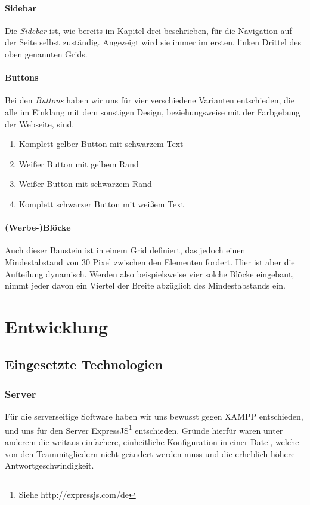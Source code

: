 \documentclass[12pt,a4paper]{article}
\begin{document}
\paragraph{Sidebar}
Die \textit{Sidebar} ist, wie bereits im Kapitel drei beschrieben, für die Navigation auf der Seite selbst zuständig. Angezeigt wird sie immer im ersten, linken Drittel des oben genannten Grids.
\paragraph{Buttons}
Bei den \textit{Buttons} haben wir uns für vier verschiedene Varianten entschieden, die alle im Einklang mit dem sonstigen Design, beziehungsweise mit der Farbgebung der Webseite, sind.
\begin{enumerate}
\item{Komplett gelber Button mit schwarzem Text}
\item{Weißer Button mit gelbem Rand}
\item{Weißer Button mit schwarzem Rand}
\item{Komplett schwarzer Button mit weißem Text}
\end{enumerate}
\paragraph{(Werbe-)Blöcke}
Auch dieser Baustein ist in einem Grid definiert, das jedoch einen Mindestabstand von 30 Pixel zwischen den Elementen fordert. Hier ist aber die Aufteilung dynamisch. Werden also beispielsweise vier solche Blöcke eingebaut, nimmt jeder davon ein Viertel der Breite abzüglich des Mindestabstands ein.
\section{Entwicklung}
\subsection{Eingesetzte Technologien}
\subsubsection{Server}
Für die serverseitige Software haben wir uns bewusst gegen XAMPP entschieden, und uns für den Server ExpressJS\footnote{\label{foot:1}Siehe http://expressjs.com/de} entschieden. Gründe hierfür waren unter anderem die weitaus einfachere, einheitliche Konfiguration in einer Datei, welche von den Teammitgliedern nicht geändert werden muss und die erheblich höhere Antwortgeschwindigkeit.
\end{document}
